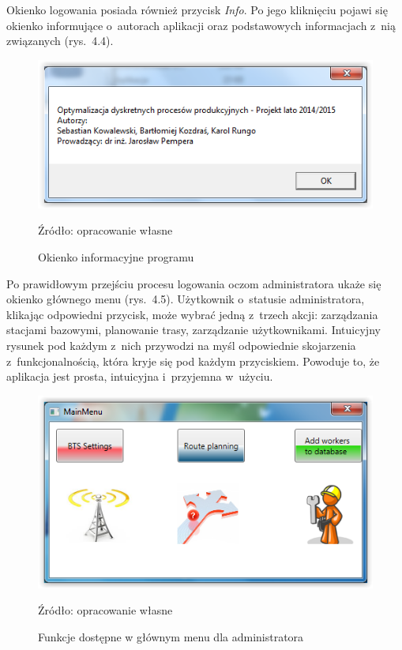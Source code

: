 \documentclass[12pt,a4paper]{report}
\begin{document}
Okienko logowania posiada również przycisk \textit{Info}. Po jego kliknięciu pojawi się okienko informujące o~autorach aplikacji oraz podstawowych informacjach z~nią związanych (rys.~4.4).

\begin{figure}[!bht]
\centering
\includegraphics[scale=1]{Pictures/Authors.png}
\label{fig: Authors}
\caption{Okienko informacyjne programu}{Źródło: opracowanie własne}
\end{figure}
\newpage
Po prawidłowym przejściu procesu logowania oczom administratora ukaże się okienko głównego menu (rys.~4.5). Użytkownik o~statusie administratora, klikając odpowiedni przycisk, może wybrać jedną z~trzech akcji: zarządzania stacjami bazowymi, planowanie trasy, zarządzanie użytkownikami. Intuicyjny rysunek pod każdym z~nich przywodzi na myśl odpowiednie skojarzenia z~funkcjonalnością, która kryje się pod każdym przyciskiem. Powoduje to, że aplikacja jest prosta, intuicyjna i~przyjemna w~użyciu. 

\begin{figure}[!bht]
\centering
\includegraphics[scale=1]{Pictures/MainMenuAdmin.png}
\label{fig: MainMenuAdmin}
\caption{Funkcje dostępne w głównym menu dla administratora}{Źródło: opracowanie własne}
\end{figure}
\end{document}
